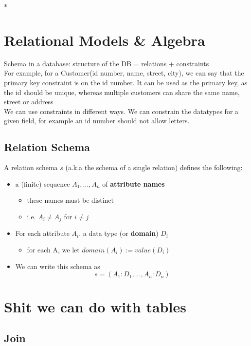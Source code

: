 \documentclass{article}
\begin{document}
\/*
\section*{Relational Models \& Algebra}
Schema in a database: structure of the DB = relations + constraints
\\For example, for a Customer(id number, name, street, city), we can say that the primary key constraint is on the id number. It can be used as the primary key, as the id should be unique, whereas multiple customers can share the same name, street or address
\\We can use constraints in different ways. We can constrain the datatypes for a given field, for example an id number should not allow letters.  
\subsection*{Relation Schema}
A relation schema $s$ (a.k.a the schema of a single relation) defines the following:
\begin{itemize}
    \item a (finite) sequence $A_1,...,A_n$ of \textbf{attribute names}
    \begin{itemize}
        \item these names must be distinct
        \item i.e. $A_i \neq A_j$ for $i \neq j$
    \end{itemize}
    \item For each attribute $A_i$, a data type (or \textbf{domain}) $D_i$
    \begin{itemize}
        \item for each A, we let $domain(A_i):= value(D_i)$
    \end{itemize}
    \item We can write this schema as $$s = (A_1 : D_1,...,A_n : D_n)$$
\end{itemize}

\section*{Shit we can do with tables}
\subsection*{Join}
\end{document}

